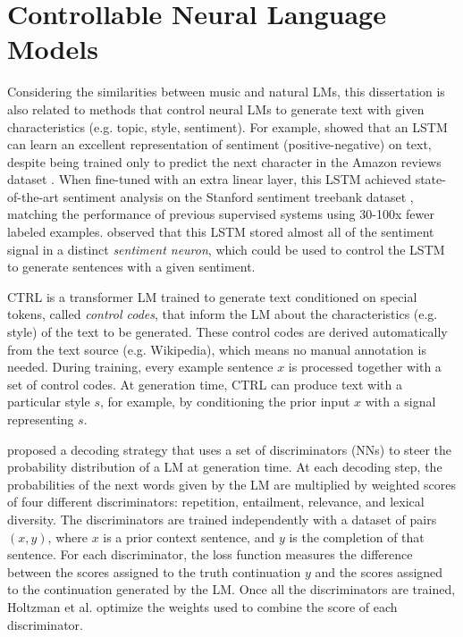 
\section{Controllable Neural Language Models}
\label{sec:related_nlp}

Considering the similarities between music and natural LMs, this dissertation is also related to methods that control neural LMs to generate text with given characteristics (e.g. topic, style, sentiment). For example, \citet{radford_2017} showed that an LSTM can learn an excellent representation of sentiment (positive-negative) on text, despite being trained only to predict the next character in the Amazon reviews dataset \cite{He2016}. When fine-tuned with an extra linear layer, this LSTM achieved state-of-the-art sentiment analysis on the Stanford sentiment treebank dataset \cite{socher2013recursive}, matching the performance of previous supervised systems using 30-100x fewer labeled examples. \citet{radford_2017} observed that this LSTM stored almost all of the sentiment signal in a distinct \textit{sentiment neuron}, which could be used to control the LSTM to generate sentences with a given sentiment.

CTRL \cite{keskar2019ctrl} is a transformer LM trained to generate text conditioned on special tokens, called \textit{control codes}, that inform the LM about the characteristics (e.g. style) of the text to be generated. These control codes are derived automatically from the text source (e.g. Wikipedia), which means no manual annotation is needed. During training, every example sentence $x$ is processed together with a set of control codes. At generation time, CTRL can produce text with a particular style $s$, for example, by conditioning the prior input $x$ with a signal representing $s$.


\citet{holtzman2018learning} proposed a decoding strategy that uses a set of discriminators (NNs) to steer the probability distribution of a LM at generation time. At each decoding step, the probabilities of the next words given by the LM are multiplied by weighted scores of four different discriminators: repetition, entailment, relevance, and lexical diversity. The discriminators are trained independently with a dataset of pairs $(x, y)$, where $x$ is a prior context sentence, and $y$ is the completion of that sentence. For each discriminator, the loss function measures the difference between the scores assigned to the truth continuation $y$ and the scores assigned to the continuation generated by the LM. Once all the discriminators are trained, Holtzman et al. \cite{holtzman2018learning} optimize the weights used to combine the score of each discriminator.

